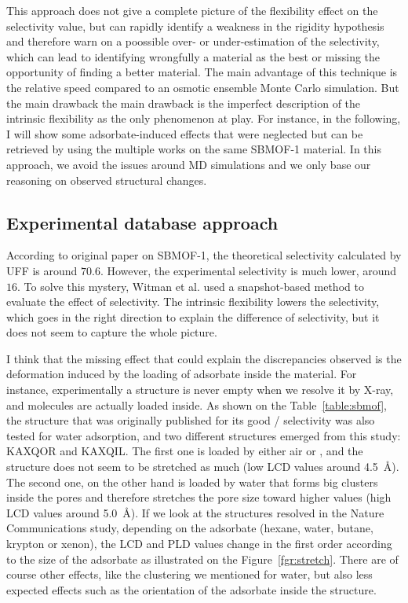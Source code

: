 \documentclass[main]{subfiles}
\begin{document}
This approach does not give a complete picture of the flexibility effect on the selectivity value, but can rapidly identify a weakness in the rigidity hypothesis and therefore warn on a poossible over- or under-estimation of the selectivity, which can lead to identifying wrongfully a material as the best or missing the opportunity of finding a better material. The main advantage of this technique is the relative speed compared to an osmotic ensemble Monte Carlo simulation.\autocite{Bousquet2012} But the main drawback the main drawback is the imperfect description of the intrinsic flexibility as the only phenomenon at play. For instance, in the following, I will show some adsorbate-induced effects that were neglected but can be retrieved by using the multiple works on the same SBMOF-1 material. In this approach, we avoid the issues around MD simulations and we only base our reasoning on observed structural changes. 


\subsection{Experimental database approach}

According to original paper on SBMOF-1,\autocite{Banerjee_2016} the theoretical selectivity calculated by UFF is around $70.6$. However, the experimental selectivity is much lower, around $16$. To solve this mystery, Witman et al. used a snapshot-based method to evaluate the effect of selectivity. The intrinsic flexibility lowers the selectivity, which goes in the right direction to explain the difference of selectivity, but it does not seem to capture the whole picture. 

I think that the missing effect that could explain the discrepancies observed is the deformation induced by the loading of adsorbate inside the material. For instance, experimentally a structure is never empty when we resolve it by X-ray, and molecules are actually loaded inside. As shown on the Table~\ref{table:sbmof}, the structure that was originally published for its good / selectivity\autocite{Yeh2012,Banerjee2012} was also tested for water adsorption, and two different structures emerged from this study: KAXQOR and KAXQIL. The first one is loaded by either air or , and the structure does not seem to be stretched as much (low LCD values around \SI{4.5}{\angstrom}). The second one, on the other hand is loaded by water that forms big clusters inside the pores and therefore stretches the pore size toward higher values (high LCD values around \SI{5.0}{\angstrom}). If we look at the structures resolved in the Nature Communications study\autocite{Banerjee_2016}, depending on the adsorbate (hexane, water, butane, krypton or xenon), the LCD and PLD values change in the first order according to the size of the adsorbate as illustrated on the Figure~\ref{fgr:stretch}. There are of course other effects, like the clustering we mentioned for water, but also less expected effects such as the orientation of the adsorbate inside the structure. 
\end{document}
